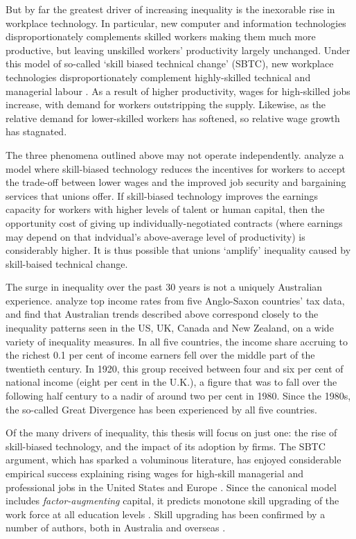But by far the greatest driver of increasing inequality is the inexorable rise in workplace technology. In particular, new computer and information technologies disproportionately complements skilled workers making them much more productive, but leaving unskilled workers' productivity largely unchanged. Under this model of so-called `skill biased technical change' (SBTC), new workplace technologies disproportionately complement highly-skilled technical and managerial labour \citep{Griliches1969,Autor2006}. As a result of higher productivity, wages for high-skilled jobs increase, with demand for workers outstripping the supply. Likewise, as the relative demand for lower-skilled workers has softened, so relative wage growth has stagnated. 

The three phenomena outlined above may not operate independently. \citet{Acemoglu2003} analyze a model where skill-biased technology reduces the incentives for workers to accept the trade-off between lower wages and the improved job security and bargaining services that unions offer. If skill-biased technology improves the earnings capacity for workers with higher levels of talent or human capital, then the opportunity cost of giving up individually-negotiated contracts (where earnings may depend on that indvidual's above-average level of productivity) is considerably higher. It is thus possible that unions `amplify' inequality caused by skill-baised technical change.

The surge in inequality over the past 30 years is not a uniquely Australian experience. \citet{Atkinson2013} analyze top income rates from five Anglo-Saxon countries' tax data, and find that Australian trends described above correspond closely to the inequality patterns seen in the US, UK, Canada and New Zealand, on a wide variety of inequality measures. In all five countries, the income share accruing to the richest 0.1 per cent of income earners fell over the middle part of the twentieth century. In 1920, this group received between four and six per cent of national income (eight per cent in the U.K.), a figure that was to fall over the following half century to a nadir of around two per cent in 1980. Since the 1980s, the so-called Great Divergence has been experienced by all five countries. 

Of the many drivers of inequality, this thesis will focus on just one: the rise of skill-biased technology, and the impact of its adoption by firms. The SBTC argument, which has sparked a voluminous literature, has enjoyed considerable empirical success explaining rising wages for high-skill managerial and professional jobs in the United States and Europe \citep{Katz1992}. Since the canonical model includes \emph{factor-augmenting} capital, it predicts monotone skill upgrading of the work force at all education levels \citep{Levy2003}. Skill upgrading has been confirmed by a number of authors, both in Australia \citep{Esposto2012, Wooden2000, Cully1999} and overseas \citep{Autor2008}. 


